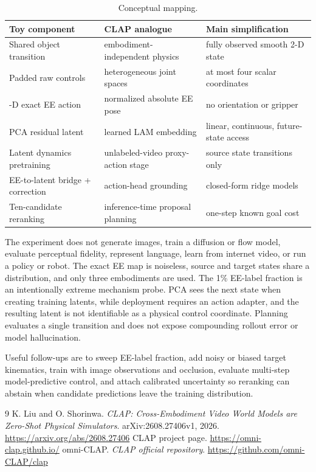 \documentclass[11pt]{article}
\begin{document}
\begin{table}[H]
\centering
\small
\begin{tabular}{>{\raggedright\arraybackslash}p{}>{\raggedright\arraybackslash}p{}>{\raggedright\arraybackslash}p{}}
\toprule
Toy component & CLAP analogue & Main simplification \\
\midrule
Shared object transition & embodiment-independent physics & fully observed smooth 2-D state \\
Padded raw controls & heterogeneous joint spaces & at most four scalar coordinates \\
2-D exact EE action & normalized absolute EE pose & no orientation or gripper \\
PCA residual latent & learned LAM embedding & linear, continuous, future-state access \\
Latent dynamics pretraining & unlabeled-video proxy-action stage & source state transitions only \\
EE-to-latent bridge + correction & action-head grounding & closed-form ridge models \\
Ten-candidate reranking & inference-time proposal planning & one-step known goal cost \\
\bottomrule
\end{tabular}
\caption{Conceptual mapping.}
\label{tab:mapping}
\end{table}

The experiment does not generate images, train a diffusion or flow model, evaluate perceptual fidelity, represent language, learn from internet video, or run a policy or robot. The exact EE map is noiseless, source and target states share a distribution, and only three embodiments are used. The 1\% EE-label fraction is an intentionally extreme mechanism probe. PCA sees the next state when creating training latents, while deployment requires an action adapter, and the resulting latent is not identifiable as a physical control coordinate. Planning evaluates a single transition and does not expose compounding rollout error or model hallucination.

Useful follow-ups are to sweep EE-label fraction, add noisy or biased target kinematics, train with image observations and occlusion, evaluate multi-step model-predictive control, and attach calibrated uncertainty so reranking can abstain when candidate predictions leave the training distribution.

\begin{thebibliography}{9}
 K. Liu and O. Shorinwa. \emph{CLAP: Cross-Embodiment Video World Models are Zero-Shot Physical Simulators}. arXiv:2608.27406v1, 2026. \url{https://arxiv.org/abs/2608.27406}
 CLAP project page. \url{https://omni-clap.github.io/}
 omni-CLAP. \emph{CLAP official repository}. \url{https://github.com/omni-CLAP/clap}
\end{thebibliography}
\end{document}
